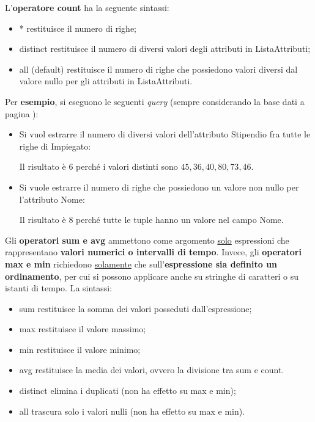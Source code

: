 \documentclass[a4paper]{article}
\begin{document}
	\noindent
	L'\textbf{operatore \textcolor{Red3}{\textsf{count}}} ha la seguente sintassi:
	
	\begin{itemize}
		\item * restituisce il numero di righe;
		\item \textsf{distinct} restituisce il numero di diversi valori degli attributi in \textsf{ListaAttributi};
		\item \textsf{all} (default) restituisce il numero di righe che possiedono valori diversi dal valore nullo per gli attributi in \textsf{ListaAttributi}.
	\end{itemize}
	Per \textcolor{Green4}{\textbf{esempio}}, si eseguono le seguenti \emph{query} (sempre considerando la base dati a pagina \pageref{select dbms}):
	\begin{itemize}
		\item Si vuol estrarre il numero di diversi valori dell'attributo \textsf{Stipendio} fra tutte le righe di \textsf{Impiegato}:
		
		Il risultato è $6$ perché i valori distinti sono $45, 36, 40, 80, 73, 46$.
		
		\item Si vuole estrarre il numero di righe che possiedono un valore non nullo per l'attributo \textsf{Nome}:
		
		Il risultato è $8$ perché tutte le tuple hanno un valore nel campo \textsf{Nome}.
	\end{itemize}\:\newline
	
	\noindent
	Gli \textbf{operatori \textcolor{Red3}{\textsf{sum}} e \textcolor{Red3}{\textsf{avg}}} ammettono come argomento \underline{solo} espressioni che rappresentano \textbf{valori numerici o intervalli di tempo}. Invece, gli \textbf{operatori \textcolor{Red3}{\textsf{max}} e \textcolor{Red3}{\textsf{min}}} richiedono \underline{solamente} che sull'\textbf{espressione sia definito un ordinamento}, per cui si possono applicare anche su stringhe di caratteri o su istanti di tempo. La sintassi:
	
	\begin{itemize}
		\item \textsf{sum} restituisce la somma dei valori posseduti dall'espressione;
		\item \textsf{max} restituisce il valore massimo;
		\item \textsf{min} restituisce il valore minimo;
		\item \textsf{avg} restituisce la media dei valori, ovvero la divisione tra \textsf{sum} e \textsf{count}.
		\item \textsf{distinct} elimina i duplicati (non ha effetto su \textsf{max} e \textsf{min});
		\item \textsf{all} trascura solo i valori nulli (non ha effetto su \textsf{max} e \textsf{min}).
	\end{itemize}\newpage
	
\end{document}
